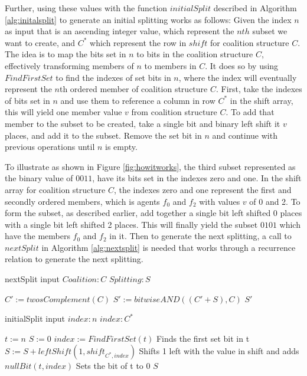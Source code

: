 \documentclass[a4paper, 12pt]{report}
\begin{document}
Further, using these values with the function $initialSplit$ described in
Algorithm \ref{alg:initalsplit} to generate an initial splitting works as
follows: Given the index $n$ as input that is an ascending integer value, which
represent the $nth$ subset we want to create, and $C^*$ which represent the row
in $shift$ for coalition structure $C$. The idea is to map the  bits set in $n$
to bits in the coalition structure $C$, effectively transforming members of $n$
to members in $C$. It does so by using $Find First Set$ to find the indexes of
set bits in $n$, where the index will eventually represent the $n$th ordered
member of coalition structure $C$. First, take the indexes of bits set in $n$
and use them to reference a column in row $C^*$ in the shift array, this will
yield one member value $v$ from coalition structure $C$. To add that member to
the subset to be created, take a single bit and binary left shift it $v$ places,
and add it to the subset. Remove the set bit in $n$ and continue with previous 
operations until $n$ is empty. 

To illustrate as shown in Figure \ref{fig:howitworks}, the third subset
represented as the binary value of $0011$, have its bits set in the indexes zero
and one. In the shift array for coalition structure $C$, the indexes zero and
one represent the first and secondly ordered members, which is agents $f_0$ and
$f_2$ with values $v$ of 0 and 2. To form the subset, as described earlier, add
together a single bit left shifted 0 places with a single bit left shifted 2
places. This will finally yield the subset $0101$ which have the members $f_0$
and $f_2$ in it. Then to generate the next splitting, a call to $nextSplit$ in
Algorithm \ref{alg:nextsplit} is needed that works through a recurrence relation
to generate the next splitting.

\begin{algorithm}
\caption{ nextSplit input $Coalition:C$ $Splitting:S$\label{alg:nextsplit}}
\begin{algorithmic}[1]
\STATE $C' := twosComplement(C)$
\STATE $S' := bitwiseAND((C'+S),C)$
\RETURN $S'$
\end{algorithmic}
\end{algorithm}

\begin{algorithm}
\caption{initialSplit input $index:n$ $index:C^*$\label{alg:initalsplit}}
\begin{algorithmic}[1]
\STATE $t := n$
\STATE $S := 0$
 { 
\STATE $index := FindFirstSet(t)$ \hfill Finds the first set bit in t
\STATE $S := S + leftShift(1,shift_{C^*,index})$ \hfill Shifts 1 left with the
value in shift and adds
\STATE $nullBit(t,index)$ \hfill Sets the bit of t to 0
}
\ENDWHILE
\RETURN $S$
\end{algorithmic}
\end{algorithm}
\end{document}
